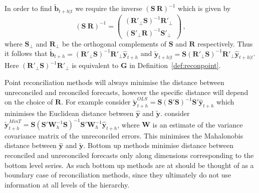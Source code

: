 \documentclass[a4paper, 11pt]{article}
\theoremstyle{theo}
\theoremstyle{definition}
\begin{document}

In order to find $\tilde{\bm{b}}_{t+h|t}$ we require the inverse $(\bm{S} ~ \bm{R})^{-1}$ which is given by
\begin{equation}
(\bm{S} ~  \bm{R})^{-1} = \begin{pmatrix}
(\bm{R}'_\bot \bm{S})^{-1}\bm{R}'_\bot \\ (\bm{S}'_\bot \bm{R})^{-1}\bm{S}'_\bot
\end{pmatrix}\,,
\end{equation}
where $\bm{S}_{\bot}$ and $\bm{R}_{\bot}$ be the orthogonal complements of $\bm{S}$ and $\bm{R}$
respectively. Thus it follows that $\tilde{\bm{b}}_{t+h}=(\bm{R}'_\bot \bm{S})^{-1}\bm{R}'_\bot \hat{\bm{y}}_{t+h}$ and $\tilde{\bm{y}}_{t+h|t}=\bm{S}(\bm{R}'_\bot \bm{S})^{-1}\bm{R}'_\bot \hat{\bm{y}}_{t+h|t}$.  Here $(\bm{R}'_\bot \bm{S})^{-1}\bm{R}'_\bot$ is equivalent to $\bm{G}$ in Definition~\ref{def:reconpoint}.

Point reconciliation methods will always minimise the distance between unreconciled and reconciled forecasts, however the specific distance will depend on the choice of ${\bm R}$.  For example \cite{Hyndman2011} consider $\tilde{\bm{y}}^{OLS}_{t+h}=\bm{S}(\bm{S}' \bm{S})^{-1}\bm{S}' \hat{\bm{y}}_{t+h}$ which minimises the Euclidean distance between $\hat{\bm y}$ and $\tilde{\bm y}$. \cite{Wickramasuriya2017} consider $\tilde{\bm{y}}^{MinT}_{t+h}=\bm{S}(\bm{S}' \bm{W}^{-1}_{h}\bm{S})^{-1}\bm{S}'\bm{W}^{-1}_{h} \hat{\bm{y}}_{t+h}$, where ${\bm W}$ is an estimate of the variance covariance matrix of the unreconciled errors.  This 
minimises the Mahalonobis distance between $\hat{\bm y}$ and $\tilde{\bm y}$.  Bottom up methods minimise distance between reconciled and unreconciled forecasts only along dimensions corresponding to the bottom level series.  As such bottom up methods are at should be thought of as a boundary case of reconciliation methods, since they ultimately do not use information at all levels of the hierarchy. 

\end{document}
